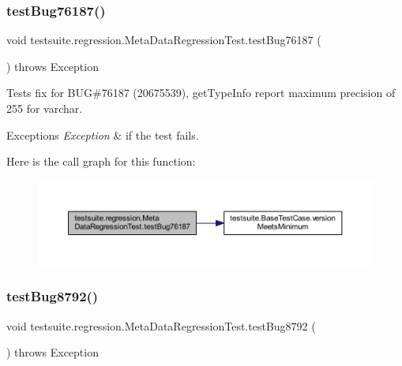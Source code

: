 \subsubsection{\texorpdfstring{test\+Bug76187()}{testBug76187()}}
{\footnotesize\ttfamily void testsuite.\+regression.\+Meta\+Data\+Regression\+Test.\+test\+Bug76187 (\begin{DoxyParamCaption}{ }\end{DoxyParamCaption}) throws Exception}

Tests fix for B\+UG\#76187 (20675539), get\+Type\+Info report maximum precision of 255 for varchar.


\begin{DoxyExceptions}{Exceptions}
{\em Exception} & if the test fails. \\
\hline
\end{DoxyExceptions}
Here is the call graph for this function\+:
\nopagebreak
\begin{figure}[H]
\begin{center}
\leavevmode
\includegraphics[width=350pt]{classtestsuite_1_1regression_1_1_meta_data_regression_test_a59b663373c79eec136ca0c2473dac25c_cgraph}
\end{center}
\end{figure}
\mbox{\label{classtestsuite_1_1regression_1_1_meta_data_regression_test_ac05ecaf65c43b94713d2dc0ab3430a94}} 
\subsubsection{\texorpdfstring{test\+Bug8792()}{testBug8792()}}
{\footnotesize\ttfamily void testsuite.\+regression.\+Meta\+Data\+Regression\+Test.\+test\+Bug8792 (\begin{DoxyParamCaption}{ }\end{DoxyParamCaption}) throws Exception}

